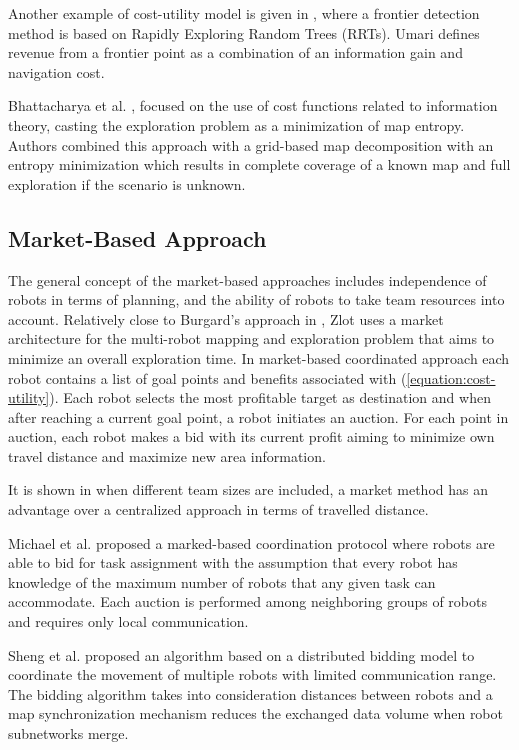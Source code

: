 Another example of cost-utility model is given in \cite{Umari2017}, where a frontier detection method is based on Rapidly Exploring Random Trees (RRTs). Umari defines revenue from a frontier point as a combination of an information gain and navigation cost. 
 
Bhattacharya et al. \cite{Bhattacharya2013}, \cite{BhattacharyaGhrist2013} focused on the use of cost functions related to information theory, casting the exploration problem as a minimization of map entropy. Authors combined this approach with a grid-based map decomposition with an entropy minimization which results in complete coverage of a known map and full exploration if the scenario is unknown. 

\subsection{Market-Based Approach}
The general concept of the market-based approaches includes independence of robots in terms of planning, and the ability of robots to take team resources into account.
Relatively close to Burgard's approach in \cite{Burgard2000}, Zlot \cite{Zlot2002} uses a market architecture for the multi-robot mapping and exploration problem that aims to minimize an overall exploration time. In market-based coordinated approach each robot contains a list of goal points and benefits associated with (\ref{equation:cost-utility}). Each robot selects the most profitable target as destination and when after reaching a current goal point, a robot initiates an auction. For each point in auction, each robot makes a bid with its current profit aiming to minimize own travel distance and maximize new area information.

It is shown in \cite{Dias2003} when different team sizes are included, a market method has an advantage over a centralized approach in terms of travelled distance. 

Michael et al. \cite{Michael2008} proposed a marked-based coordination protocol where robots are able to bid for task assignment with the assumption that every robot has knowledge of the maximum number of robots that any given task can accommodate. Each auction is performed among neighboring groups of robots and requires only local communication.

Sheng et al. \cite{Sheng2006} proposed an algorithm based on a distributed bidding model to coordinate the movement of multiple robots with limited communication range. The bidding algorithm takes into consideration distances between robots and a map synchronization mechanism reduces the exchanged data volume when robot subnetworks merge.

